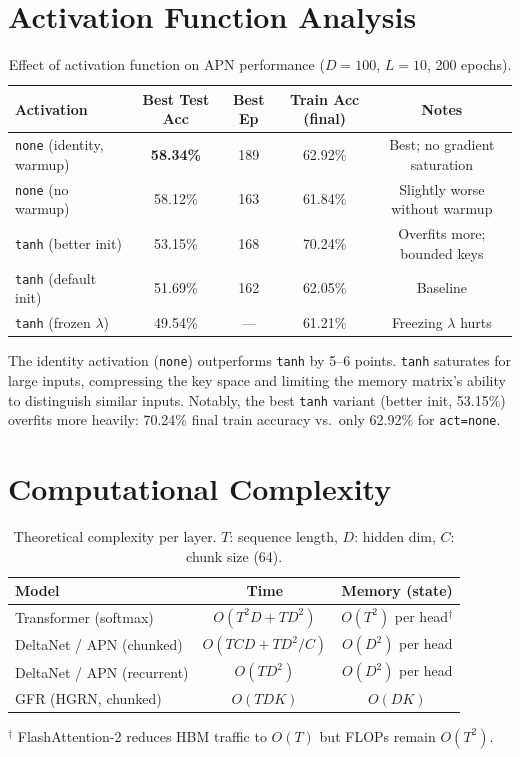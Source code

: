 \documentclass[11pt,a4paper]{article}
\begin{document}
\section{Activation Function Analysis}

\begin{table}[h]
\centering
\caption{Effect of activation function on APN performance ($D=100$, $L=10$, 200 epochs).}
\label{tab:activations}
\begin{tabular}{lcccc}
\toprule
\textbf{Activation} & \textbf{Best Test Acc} & \textbf{Best Ep} & \textbf{Train Acc (final)} & \textbf{Notes} \\
\midrule
\texttt{none} (identity, warmup) & \textbf{58.34\%} & 189 & 62.92\% & Best; no gradient saturation \\
\texttt{none} (no warmup) & 58.12\% & 163 & 61.84\% & Slightly worse without warmup \\
\texttt{tanh} (better init) & 53.15\% & 168 & 70.24\% & Overfits more; bounded keys \\
\texttt{tanh} (default init) & 51.69\% & 162 & 62.05\% & Baseline \\
\texttt{tanh} (frozen $\lambda$) & 49.54\% & --- & 61.21\% & Freezing $\lambda$ hurts \\
\bottomrule
\end{tabular}
\end{table}

The identity activation (\texttt{none}) outperforms \texttt{tanh} by 5--6 points.
\texttt{tanh} saturates for large inputs, compressing the key space and limiting the memory matrix's ability to distinguish similar inputs.
Notably, the best \texttt{tanh} variant (better init, 53.15\%) overfits more heavily: 70.24\% final train accuracy vs.\ only 62.92\% for \texttt{act=none}.

\section{Computational Complexity}

\begin{table}[h]
\centering
\caption{Theoretical complexity per layer. $T$: sequence length, $D$: hidden dim, $C$: chunk size (64).}
\label{tab:complexity}
\begin{tabular}{lcc}
\toprule
\textbf{Model} & \textbf{Time} & \textbf{Memory (state)} \\
\midrule
Transformer (softmax) & $O(T^2 D + T D^2)$ & $O(T^2)$ per head${}^\dagger$ \\
DeltaNet / APN (chunked) & $O(TCD + TD^2/C)$ & $O(D^2)$ per head \\
DeltaNet / APN (recurrent) & $O(TD^2)$ & $O(D^2)$ per head \\
GFR (HGRN, chunked) & $O(TDK)$ & $O(DK)$ \\
\bottomrule
\end{tabular}

\smallskip
{\footnotesize ${}^\dagger$ FlashAttention-2 reduces HBM traffic to $O(T)$ but FLOPs remain $O(T^2)$.}
\end{table}
\end{document}
